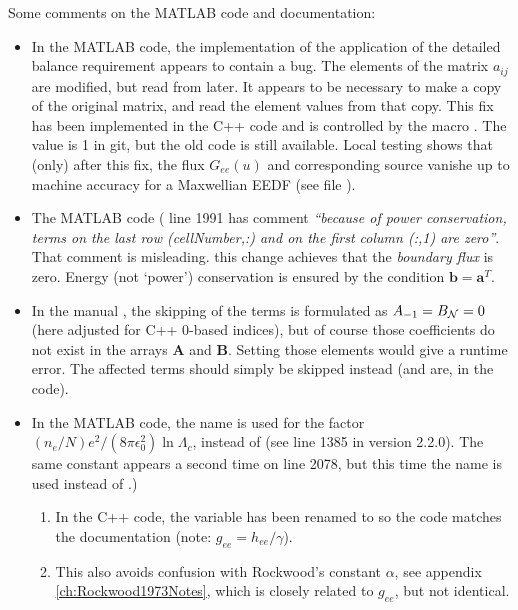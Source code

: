 \documentclass{book}
\newcommand{\bmat}[1]{{\ensuremath{\bm {#1}}}}
\newcommand{\bvec}[1]{{\ensuremath{\bm {#1}}}}
\begin{document}
\begin{framed}
Some comments on the MATLAB code and documentation:
\begin{itemize}
  \item In the MATLAB code, the implementation of the application of the detailed
    balance requirement appears to contain a bug. The elements of the
    matrix $a_{ij}$ are modified, but read from later. It appears to be
    necessary to make a copy of the original matrix, and read the element
    values from that copy. This fix has been implemented in the C++ code
    and is controlled by the macro . The value
    is 1 in git, but the old code is still available. Local testing
    shows that (only) after this fix, the flux $G_{ee}(u)$ and corresponding
    source vanishe up to machine accuracy for a Maxwellian EEDF (see file
    ).
  \item The MATLAB code ( line 1991 has
    comment {\em ``because of power conservation, terms on the last row (cellNumber,:)
    and on the first column (:,1) are zero''}. That comment is misleading.
    this change achieves that the {\em boundary flux} is zero. Energy (not `power')
    conservation is ensured by the condition $\bmat{b}=\bmat{a}^T$.
  \item In the manual \cite[text below eq 41c]{Manual_2_2_0}, the skipping
    of the terms is formulated as $A_{-1}=B_{\cal N}=0$ (here adjusted
    for C++ 0-based indices), but of course those coefficients do not
    exist in the arrays $\bvec{A}$ and $\bvec{B}$. Setting those elements
    would give a runtime error. The affected terms should simply be skipped
    instead (and are, in the code).
  \item In the MATLAB code, the name  is used for the factor
    $(n_e/N)e^2/(8\pi\epsilon_0^2)\ln\Lambda_c$, instead of 
    (see  line 1385 in version 2.2.0). The same constant appears
    a second time on line 2078, but this time the name  is used
    instead of .)
    \begin{enumerate}
      \item In the C++ code, the variable  has been renamed to 
        so the code matches the documentation (note: $g_{ee}=h_{ee}/\gamma$).
      \item This also avoids confusion with Rockwood's constant $\alpha$,
        see appendix \ref{ch:Rockwood1973Notes}, which is closely related to
        $g_{ee}$, but not identical.

\end{enumerate}
\end{itemize}
\end{framed}
\end{document}
